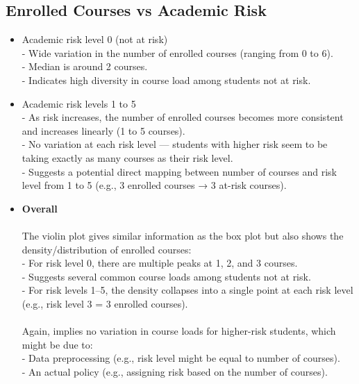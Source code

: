 \documentclass[12pt]{article}
\begin{document}
\subsection{Enrolled Courses vs Academic Risk}

\begin{itemize}
    \item Academic risk level 0 (not at risk)\\
    - Wide variation in the number of enrolled courses (ranging from 0 to 6).\\
    - Median is around 2 courses.\\
    - Indicates high diversity in course load among students not at risk.

    \item Academic risk levels 1 to 5\\
    - As risk increases, the number of enrolled courses becomes more consistent and increases linearly (1 to 5 courses).\\
    - No variation at each risk level — students with higher risk seem to be taking exactly as many courses as their risk level.\\
    - Suggests a potential direct mapping between number of courses and risk level from 1 to 5 (e.g., 3 enrolled courses → 3 at-risk courses).

    \item \textbf{Overall}\\ \\
     The violin plot gives similar information as the box plot but also shows the density/distribution of enrolled courses:\\
    - For risk level 0, there are multiple peaks at 1, 2, and 3 courses.\\
    - Suggests several common course loads among students not at risk.\\
    - For risk levels 1–5, the density collapses into a single point at each risk level (e.g., risk level 3 = 3 enrolled courses).\\ \\
     Again, implies no variation in course loads for higher-risk students, which might be due to:\\
    - Data preprocessing (e.g., risk level might be equal to number of courses).\\
    - An actual policy (e.g., assigning risk based on the number of courses).
\end{itemize}
\end{document}
